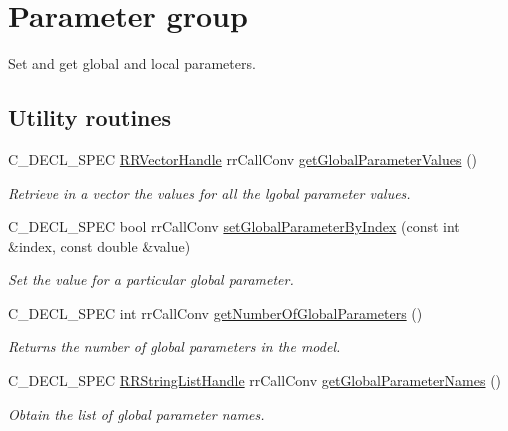 \hypertarget{group__parameters}{
\section{\-Parameter group}
\label{group__parameters}
}


\-Set and get global and local parameters.  


\subsection*{\-Utility routines}
\begin{DoxyCompactItemize}
\item 
\-C\-\_\-\-D\-E\-C\-L\-\_\-\-S\-P\-E\-C \hyperlink{rr__c__types_8h_aea46a16752b0ae2cd95c009030ee630e}{\-R\-R\-Vector\-Handle} \*
rr\-Call\-Conv \hyperlink{group__utility_gaf4be0a5e72db408248569a1d3e28c1f0}{get\-Global\-Parameter\-Values} ()
\begin{DoxyCompactList}\small\item\em \-Retrieve in a vector the values for all the lgobal parameter values. \end{DoxyCompactList}\item 
\-C\-\_\-\-D\-E\-C\-L\-\_\-\-S\-P\-E\-C bool rr\-Call\-Conv \hyperlink{group__utility_ga65d9546856e5526fc403539903039f8e}{set\-Global\-Parameter\-By\-Index} (const int \&index, const double \&value)
\begin{DoxyCompactList}\small\item\em \-Set the value for a particular global parameter. \end{DoxyCompactList}\item 
\hypertarget{group__utility_ga2f33a70dfd6c68fb585cf5d1a9c1339c}{
\-C\-\_\-\-D\-E\-C\-L\-\_\-\-S\-P\-E\-C int rr\-Call\-Conv \hyperlink{group__utility_ga2f33a70dfd6c68fb585cf5d1a9c1339c}{get\-Number\-Of\-Global\-Parameters} ()}
\label{group__utility_ga2f33a70dfd6c68fb585cf5d1a9c1339c}

\begin{DoxyCompactList}\small\item\em \-Returns the number of global parameters in the model. \end{DoxyCompactList}\item 
\-C\-\_\-\-D\-E\-C\-L\-\_\-\-S\-P\-E\-C \hyperlink{rr__c__types_8h_abf561b014879247b7b92ee99c205de21}{\-R\-R\-String\-List\-Handle} \*
rr\-Call\-Conv \hyperlink{group__utility_gabb7dd0b1f55a9f1c5ded728aa202027e}{get\-Global\-Parameter\-Names} ()
\begin{DoxyCompactList}\small\item\em \-Obtain the list of global parameter names. \end{DoxyCompactList}\end{DoxyCompactItemize}


